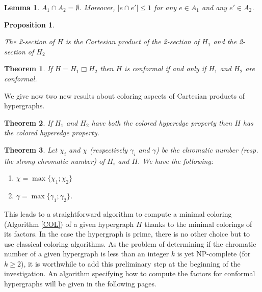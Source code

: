 \documentclass[copyright]{eptcs}
\newtheorem{Lem}{Lemma}
\newtheorem{Prop}{Proposition}
\newtheorem{Theo}{Theorem}
\newcommand{\chg}[1]{{#1}}
\begin{document}
\begin{Lem}\label{Fond}
$A_{1}\cap A_{2} = \emptyset$. Moreover, $\vert e\cap e'\vert \leq 1$ for any $e\in A_{1}$ and any $e' \in A_2$.
\end{Lem}





\begin{Prop}\label{Prop2Section}

The 2-section of $H$ is the Cartesian product of the 2-section of $H_1$ and the 2-section of $H_2$
\end{Prop}

\begin{Theo}\label{ThmConformalCartesianStable} If $H = H_1\Box H_2$ then $H$ is conformal if and only if  $H_1$ and  $H_2$ are conformal.
\end{Theo}



\noindent We give now two new results about coloring aspects of Cartesian products of hypergraphs.

\begin{Theo}

 If $H_1$ and $H_2$ \chg{have} both the colored hyperedge property then $H$ has the colored hyperedge property.
\end{Theo}


\begin{Theo} Let $\chi _i$ and $\chi$ (respectively $\gamma _i$ and $\gamma$) be the chromatic number (resp. the strong chromatic number) of $H_i$ and $H$. We have the following:
\begin{enumerate}
\item $\chi =\max\{\chi _1; \chi _2\}$
\item $\gamma =\max\{\gamma _1; \gamma _2\}$.
\end{enumerate}
\end{Theo}


This leads to a straightforward algorithm to compute a minimal coloring (Algorithm \ref{COL}) of a given hypergraph $H$ thanks to the minimal colorings of its factors. In the case the hypergraph is prime, there is no other choice but to use classical coloring algorithms. As the problem of determining if the chromatic number of a given hypergraph is less than an integer $k$ is yet NP-complete (for $k \geqslant 2$), it is worthwhile to add this preliminary step at the beginning of the investigation. An algorithm specifying how to compute the factors for conformal hypergraphs will be given in the following pages.
\end{document}
